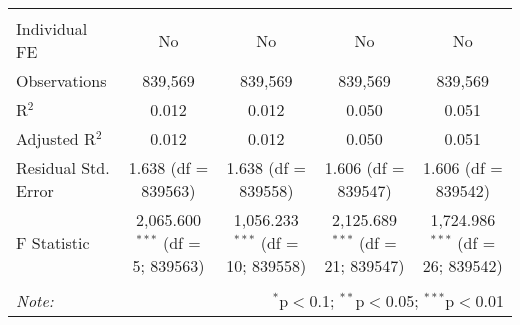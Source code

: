 \documentclass[
]{article}
\begin{document}
\begin{table}[!htbp]
{\begin{tabular}{@{\extracolsep{5pt}}lcccc}
\hline \\[-1.8ex] 
Individual FE & No & No & No & No \\ 
Observations & 839,569 & 839,569 & 839,569 & 839,569 \\ 
R$^{2}$ & 0.012 & 0.012 & 0.050 & 0.051 \\ 
Adjusted R$^{2}$ & 0.012 & 0.012 & 0.050 & 0.051 \\ 
Residual Std. Error & 1.638 (df = 839563) & 1.638 (df = 839558) & 1.606 (df = 839547) & 1.606 (df = 839542) \\ 
F Statistic & 2,065.600$^{***}$ (df = 5; 839563) & 1,056.233$^{***}$ (df = 10; 839558) & 2,125.689$^{***}$ (df = 21; 839547) & 1,724.986$^{***}$ (df = 26; 839542) \\ 
\hline 
\hline \\[-1.8ex] 
\textit{Note:}  & \multicolumn{4}{r}{$^{*}$p$<$0.1; $^{**}$p$<$0.05; $^{***}$p$<$0.01} \\ 
\end{tabular}
} 
\end{table} 
\newpage
\end{document}
